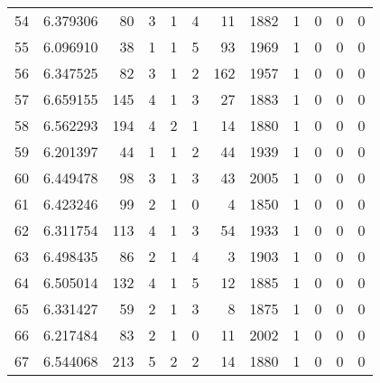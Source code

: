 \begin{tabular}{lrrrrrrrrrrr}
54  &  6.379306 &   80 &      3 &        1 &      4 &              11 &  1882 &               1 &               0 &               0 &               0 \\
55  &  6.096910 &   38 &      1 &        1 &      5 &              93 &  1969 &               1 &               0 &               0 &               0 \\
56  &  6.347525 &   82 &      3 &        1 &      2 &             162 &  1957 &               1 &               0 &               0 &               0 \\
57  &  6.659155 &  145 &      4 &        1 &      3 &              27 &  1883 &               1 &               0 &               0 &               0 \\
58  &  6.562293 &  194 &      4 &        2 &      1 &              14 &  1880 &               1 &               0 &               0 &               0 \\
59  &  6.201397 &   44 &      1 &        1 &      2 &              44 &  1939 &               1 &               0 &               0 &               0 \\
60  &  6.449478 &   98 &      3 &        1 &      3 &              43 &  2005 &               1 &               0 &               0 &               0 \\
61  &  6.423246 &   99 &      2 &        1 &      0 &               4 &  1850 &               1 &               0 &               0 &               0 \\
62  &  6.311754 &  113 &      4 &        1 &      3 &              54 &  1933 &               1 &               0 &               0 &               0 \\
63  &  6.498435 &   86 &      2 &        1 &      4 &               3 &  1903 &               1 &               0 &               0 &               0 \\
64  &  6.505014 &  132 &      4 &        1 &      5 &              12 &  1885 &               1 &               0 &               0 &               0 \\
65  &  6.331427 &   59 &      2 &        1 &      3 &               8 &  1875 &               1 &               0 &               0 &               0 \\
66  &  6.217484 &   83 &      2 &        1 &      0 &              11 &  2002 &               1 &               0 &               0 &               0 \\
67  &  6.544068 &  213 &      5 &        2 &      2 &              14 &  1880 &               1 &               0 &               0 &               0 \\

\end{tabular}
